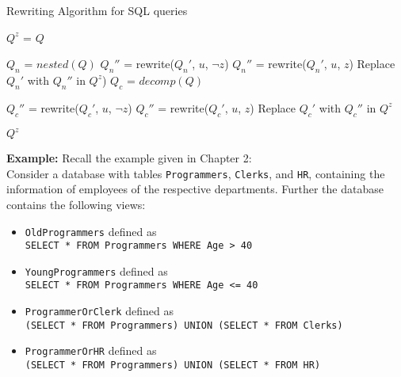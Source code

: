 \begin{algorithm}
\caption{Rewriting Algorithm for SQL queries}
\label{alg:algorithms:rewrite}
	\SetAlgoLined
	$Q^z$ = $Q$\;
	
	$Q_n$ = $\mathit{nested}(Q)$\;
		{
				{
					{$Q_n''$ = rewrite($Q_n'$, $u$, $\lnot z$)\;}
					{$Q_n''$ = rewrite($Q_n'$, $u$, $z$)\;}
					Replace $Q_n'$ with $Q_n''$ in $Q^z$)\;
				}
		}
	$Q_c$ = $\mathit{decomp}(Q)$\;
		{
				{
					{$Q_c''$ = rewrite($Q_c'$, $u$, $\lnot z$)\;}
					{$Q_c''$ = rewrite($Q_c'$, $u$, $z$)\;}
					Replace $Q_c'$ with $Q_c''$ in $Q^z$\;
				}
				
		}
	\Return $Q^z$\;

\end{algorithm}
\smallskip
\noindent
{\bf Example:}
Recall the example given in Chapter 2:
\\
Consider a database with tables \texttt{Programmers}, \texttt{Clerks}, and \texttt{HR}, containing the information of employees of the respective departments.
%
Further the database contains the following views:
\begin{itemize}
	\item \texttt{OldProgrammers} defined as \\ \texttt{SELECT * FROM Programmers WHERE Age > 40}
	\item \texttt{YoungProgrammers} defined as \\ \texttt{SELECT * FROM Programmers WHERE Age <= 40}
	\item \texttt{ProgrammerOrClerk} defined as \\ \texttt{(SELECT * FROM Programmers) UNION (SELECT * FROM Clerks)}
	\item \texttt{ProgrammerOrHR} defined as \\ \texttt{(SELECT * FROM Programmers) UNION (SELECT * FROM HR)}
\end{itemize}
